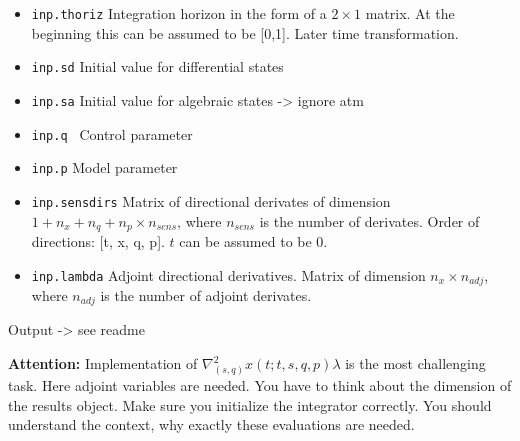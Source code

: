 \documentclass[12pt]{article}
\begin{document}
\begin{itemize}
    \item \texttt{inp.thoriz} Integration horizon in the form of a $2 \times 1$ matrix. At the beginning  this can be assumed to be [0,1]. Later time transformation.
    \item \texttt{inp.sd} Initial value for differential states 
    \item \texttt{inp.sa} Initial value for algebraic states -> ignore atm
    \item \texttt{inp.q } Control parameter
    \item \texttt{inp.p} Model parameter
    \item \texttt{inp.sensdirs} Matrix of directional derivates of dimension $1+n_x+n_q+n_p \times n_{sens}$, where $n_{sens}$ is the number of derivates.
         Order of directions: [t, x, q, p]. $t$ can be assumed to be 0.
    \item \texttt{inp.lambda} Adjoint directional derivatives. 
           Matrix of dimension $n_x \times n_{adj}$, where $n_{adj}$ is the number of adjoint derivates.
\end{itemize}


Output -> see readme


\textbf{Attention:} Implementation of $\nabla^2_{(s,q)} x(t;t,s,q,p) \lambda$ is the most challenging task. 
Here adjoint variables are needed. 
You have to think about the dimension of the results object. Make sure you initialize the integrator correctly. 
You should understand the context, why exactly these evaluations are needed.
\end{document}
